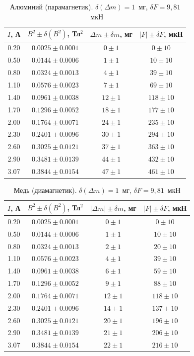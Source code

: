 \documentclass[a4paper,12pt]{article}
\begin{document}
	\begin{table}[H]
		\centering
		\caption{Алюминий (парамагнетик). $\delta(\Delta m) = 1$~мг, $\delta F = 9{,}81$~мкН}
		\label{tab:Al}
		\begin{tabular}{cccc}
			\toprule
			$I$, А & $B^2 \pm \delta(B^2)$, Тл$^2$ & $\Delta m \pm \delta m$, мг & $|F| \pm \delta F$, мкН \\
			\midrule
			0.20 & $0.0025 \pm 0.0001$ & $0 \pm 1$  & $0 \pm 10$ \\
			0.50 & $0.0144 \pm 0.0006$ & $1 \pm 1$  & $10 \pm 10$ \\
			0.80 & $0.0324 \pm 0.0013$ & $4 \pm 1$  & $39 \pm 10$ \\
			1.10 & $0.0576 \pm 0.0023$ & $7 \pm 1$  & $69 \pm 10$ \\
			1.40 & $0.0961 \pm 0.0038$ & $12 \pm 1$ & $118 \pm 10$ \\
			1.70 & $0.1296 \pm 0.0052$ & $18 \pm 1$ & $177 \pm 10$ \\
			2.00 & $0.1764 \pm 0.0071$ & $24 \pm 1$ & $235 \pm 10$ \\
			2.30 & $0.2401 \pm 0.0096$ & $30 \pm 1$ & $294 \pm 10$ \\
			2.60 & $0.3025 \pm 0.0121$ & $37 \pm 1$ & $363 \pm 10$ \\
			2.90 & $0.3481 \pm 0.0139$ & $44 \pm 1$ & $432 \pm 10$ \\
			3.07 & $0.3844 \pm 0.0154$ & $47 \pm 1$ & $461 \pm 10$ \\
			\bottomrule
		\end{tabular}
	\end{table}
	
	\begin{table}[H]
		\centering
		\caption{Медь (диамагнетик). $\delta(\Delta m) = 1$~мг, $\delta F = 9{,}81$~мкН}
		\label{tab:Cu}
		\begin{tabular}{cccc}
			\toprule
			$I$, А & $B^2 \pm \delta(B^2)$, Тл$^2$ & $|\Delta m| \pm \delta m$, мг & $|F| \pm \delta F$, мкН \\
			\midrule
			0.20 & $0.0025 \pm 0.0001$ & $0 \pm 1$  & $0 \pm 10$ \\
			0.50 & $0.0144 \pm 0.0006$ & $1 \pm 1$  & $10 \pm 10$ \\
			0.80 & $0.0324 \pm 0.0013$ & $2 \pm 1$  & $20 \pm 10$ \\
			1.10 & $0.0576 \pm 0.0023$ & $4 \pm 1$  & $39 \pm 10$ \\
			1.40 & $0.0961 \pm 0.0038$ & $6 \pm 1$  & $59 \pm 10$ \\
			1.70 & $0.1296 \pm 0.0052$ & $9 \pm 1$  & $88 \pm 10$ \\
			2.00 & $0.1764 \pm 0.0071$ & $12 \pm 1$ & $118 \pm 10$ \\
			2.30 & $0.2401 \pm 0.0096$ & $14 \pm 1$ & $137 \pm 10$ \\
			2.60 & $0.3025 \pm 0.0121$ & $20 \pm 1$ & $196 \pm 10$ \\
			2.90 & $0.3481 \pm 0.0139$ & $21 \pm 1$ & $206 \pm 10$ \\
			3.07 & $0.3844 \pm 0.0154$ & $22 \pm 1$ & $216 \pm 10$ \\
			\bottomrule
		\end{tabular}
	\end{table}
	
\end{document}
